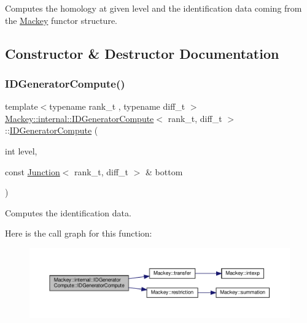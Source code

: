 Computes the homology at given level and the identification data coming from the \hyperlink{namespaceMackey}{Mackey} functor structure. 

\subsection{Constructor \& Destructor Documentation}
\mbox{\label{classMackey_1_1internal_1_1IDGeneratorCompute_a39700cf08ba57766c87498975b28ec62}} 
\subsubsection{\texorpdfstring{I\+D\+Generator\+Compute()}{IDGeneratorCompute()}}
{\footnotesize\ttfamily template$<$typename rank\+\_\+t , typename diff\+\_\+t $>$ \\
\hyperlink{classMackey_1_1internal_1_1IDGeneratorCompute}{Mackey\+::internal\+::\+I\+D\+Generator\+Compute}$<$ rank\+\_\+t, diff\+\_\+t $>$\+::\hyperlink{classMackey_1_1internal_1_1IDGeneratorCompute}{I\+D\+Generator\+Compute} (\begin{DoxyParamCaption}\item[{int}]{level,  }\item[{const \hyperlink{classMackey_1_1Junction}{Junction}$<$ rank\+\_\+t, diff\+\_\+t $>$ \&}]{bottom }\end{DoxyParamCaption})}



Computes the identification data. 

Here is the call graph for this function\+:\nopagebreak
\begin{figure}[H]
\begin{center}
\leavevmode
\includegraphics[width=350pt]{classMackey_1_1internal_1_1IDGeneratorCompute_a39700cf08ba57766c87498975b28ec62_cgraph}
\end{center}
\end{figure}


